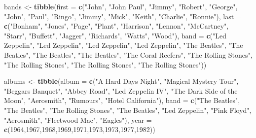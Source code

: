 \documentclass[
]{book}
\newenvironment{Shaded}{\begin{snugshade}}{\end{snugshade}}
\newcommand{\AttributeTok}[1]{\textcolor[rgb]{0.13,0.29,0.53}{#1}}
\newcommand{\DecValTok}[1]{\textcolor[rgb]{0.00,0.00,0.81}{#1}}
\newcommand{\FunctionTok}[1]{\textcolor[rgb]{0.13,0.29,0.53}{\textbf{#1}}}
\newcommand{\NormalTok}[1]{#1}
\newcommand{\OtherTok}[1]{\textcolor[rgb]{0.56,0.35,0.01}{#1}}
\newcommand{\StringTok}[1]{\textcolor[rgb]{0.31,0.60,0.02}{#1}}
\begin{document}
\begin{Shaded}
\begin{Highlighting}[]
\NormalTok{bands }\OtherTok{\textless{}{-}} \FunctionTok{tibble}\NormalTok{(}\AttributeTok{first =} \FunctionTok{c}\NormalTok{(}\StringTok{"John"}\NormalTok{, }\StringTok{"John Paul"}\NormalTok{, }\StringTok{"Jimmy"}\NormalTok{, }\StringTok{"Robert"}\NormalTok{, }\StringTok{"George"}\NormalTok{, }\StringTok{"John"}\NormalTok{, }
                          \StringTok{"Paul"}\NormalTok{, }\StringTok{"Ringo"}\NormalTok{, }\StringTok{"Jimmy"}\NormalTok{, }\StringTok{"Mick"}\NormalTok{, }\StringTok{"Keith"}\NormalTok{, }\StringTok{"Charlie"}\NormalTok{, }\StringTok{"Ronnie"}\NormalTok{), }
                \AttributeTok{last =} \FunctionTok{c}\NormalTok{(}\StringTok{"Bonham"}\NormalTok{, }\StringTok{"Jones"}\NormalTok{, }\StringTok{"Page"}\NormalTok{, }\StringTok{"Plant"}\NormalTok{, }\StringTok{"Harrison"}\NormalTok{, }\StringTok{"Lennon"}\NormalTok{,}
                         \StringTok{"McCartney"}\NormalTok{, }\StringTok{"Starr"}\NormalTok{, }\StringTok{"Buffett"}\NormalTok{, }\StringTok{"Jagger"}\NormalTok{, }\StringTok{"Richards"}\NormalTok{, }\StringTok{"Watts"}\NormalTok{, }\StringTok{"Wood"}\NormalTok{), }
                \AttributeTok{band =} \FunctionTok{c}\NormalTok{(}\StringTok{"Led Zeppelin"}\NormalTok{, }\StringTok{"Led Zeppelin"}\NormalTok{, }\StringTok{"Led Zeppelin"}\NormalTok{, }\StringTok{"Led Zeppelin"}\NormalTok{,}
                         \StringTok{"The Beatles"}\NormalTok{, }\StringTok{"The Beatles"}\NormalTok{, }\StringTok{"The Beatles"}\NormalTok{, }\StringTok{"The Beatles"}\NormalTok{,}
                         \StringTok{"The Coral Reefers"}\NormalTok{, }\StringTok{"The Rolling Stones"}\NormalTok{, }\StringTok{"The Rolling Stones"}\NormalTok{,}
                         \StringTok{"The Rolling Stones"}\NormalTok{, }\StringTok{"The Rolling Stones"}\NormalTok{))}

\NormalTok{albums }\OtherTok{\textless{}{-}} \FunctionTok{tibble}\NormalTok{(}\AttributeTok{album =} \FunctionTok{c}\NormalTok{(}\StringTok{"A Hard Day\textquotesingle{}s Night"}\NormalTok{, }\StringTok{"Magical Mystery Tour"}\NormalTok{, }\StringTok{"Beggar\textquotesingle{}s Banquet"}\NormalTok{,}
                           \StringTok{"Abbey Road"}\NormalTok{, }\StringTok{"Led Zeppelin IV"}\NormalTok{, }\StringTok{"The Dark Side of the Moon"}\NormalTok{, }\StringTok{"Aerosmith"}\NormalTok{,}
                           \StringTok{"Rumours"}\NormalTok{, }\StringTok{"Hotel California"}\NormalTok{),}
                 \AttributeTok{band =} \FunctionTok{c}\NormalTok{(}\StringTok{"The Beatles"}\NormalTok{, }\StringTok{"The Beatles"}\NormalTok{, }\StringTok{"The Rolling Stones"}\NormalTok{, }\StringTok{"The Beatles"}\NormalTok{, }
                          \StringTok{"Led Zeppelin"}\NormalTok{, }\StringTok{"Pink Floyd"}\NormalTok{, }\StringTok{"Aerosmith"}\NormalTok{, }\StringTok{"Fleetwood Mac"}\NormalTok{, }\StringTok{"Eagles"}\NormalTok{), }
                 \AttributeTok{year =} \FunctionTok{c}\NormalTok{(}\DecValTok{1964}\NormalTok{,}\DecValTok{1967}\NormalTok{,}\DecValTok{1968}\NormalTok{,}\DecValTok{1969}\NormalTok{,}\DecValTok{1971}\NormalTok{,}\DecValTok{1973}\NormalTok{,}\DecValTok{1973}\NormalTok{,}\DecValTok{1977}\NormalTok{,}\DecValTok{1982}\NormalTok{))}



\end{Highlighting}
\end{Shaded}
\end{document}
